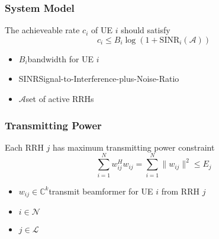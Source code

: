 \documentclass[usenames,dvipsnames]{beamer}
\begin{document}
\begin{frame}
  \frametitle{System Model}
  \begin{exampleblock}{The achieveable rate $c_{i}$ of UE $i$ should satisfy}
    \[
      c_{i} \leq B_{i}\log(1+\text{SINR}_{i}(\mathcal{A})) 
    \] 
  \end{exampleblock}
  \begin{itemize}
    \item $B_{i}$\qquad bandwidth for UE $i$\\
    \item SINR\quad Signal-to-Interference-plus-Noise-Ratio\\
    \item $\mathcal{A}$\qquad set of active RRHs
  \end{itemize}
\end{frame}
\begin{frame}
  \frametitle{Transmitting Power}
  \begin{exampleblock}{Each RRH $j$ has maximum transmitting power constraint}
    \[
      \sum_{i = 1}^{N}w_{ij}^{H}w_{ij}  = \sum_{i = 1}^{N} \lVert w_{ij}\rVert^2 \leq E_{j}
    \]
  \end{exampleblock}
  \begin{itemize}
    \item $w_{ij}\in\mathbb{C}^{k}$\quad transmit beamformer for UE $i$ from RRH $j$
    \item $i\in\mathcal{N}$
    \item $j\in\mathcal{L}$
  \end{itemize}
\end{frame}
\end{document}
